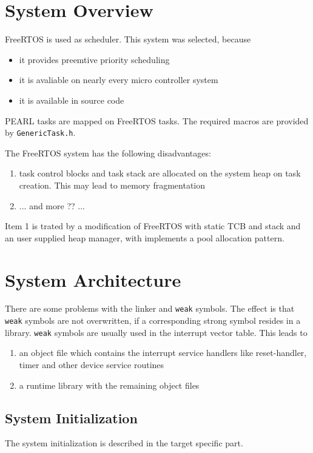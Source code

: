 \section{System Overview}
FreeRTOS is used as scheduler. This system was selected, because
\begin{itemize}
\item it provides preemtive priority scheduling
\item it is avaliable on nearly every micro controller system
\item it is available in source code
\end{itemize}

PEARL tasks are mapped on FreeRTOS tasks. The required macros
are provided by \texttt{GenericTask.h}.

The FreeRTOS system has the following disadvantages:
\begin{enumerate}
\item task control blocks and task stack are allocated on the system
   heap on task creation. This may lead to memory fragmentation
\item ... and more ?? ... 
\end{enumerate}

Item 1 is trated by a modification of FreeRTOS with static TCB and stack
and an user supplied heap manager, with implements a pool allocation pattern.

\section{System Architecture}
There are some problems with the linker and \texttt{weak} symbols.
The effect is that \texttt{weak} symbols are not overwritten, if
a corresponding strong symbol resides in a library.
\texttt{weak} symbols are usually used in the interrupt vector table.
This leads to
\begin{enumerate}
\item an object file which contains the interrupt service handlers like
   reset-handler, timer and other device service routines
\item a runtime library with the remaining object files
\end{enumerate}

\subsection{System Initialization}
The system initialization is described in the target specific part.

